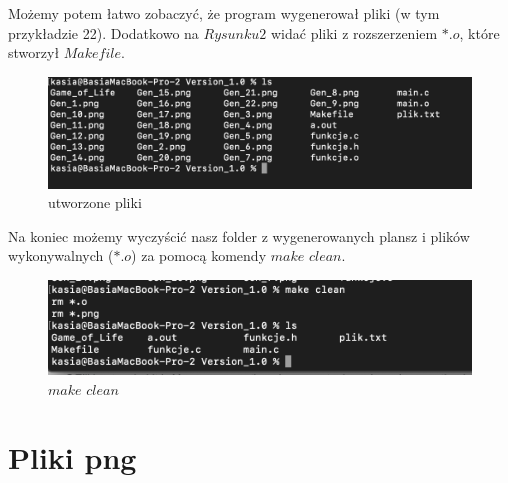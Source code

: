 \documentclass[11pt]{article}
\begin{document}
\newpage Możemy potem łatwo zobaczyć, że program wygenerował pliki (w tym przykładzie 22). Dodatkowo na $Rysunku 2$ widać pliki z rozszerzeniem $*.o$, które stworzył $Makefile$.\\
\begin{figure}[h!]
	\includegraphics[width=\linewidth]{nowe_pliki.png}
	\caption{utworzone pliki}
	
	\end{figure}

Na koniec możemy wyczyścić nasz folder z wygenerowanych plansz i plików wykonywalnych ($*.o$) za pomocą komendy $make$ $clean$.

\begin{figure}[h!]
	\includegraphics[width=\linewidth]{clean.png}
	\caption{$make$ $clean$}
	\end{figure}
\newpage	
\section{Pliki png}
\end{document}
